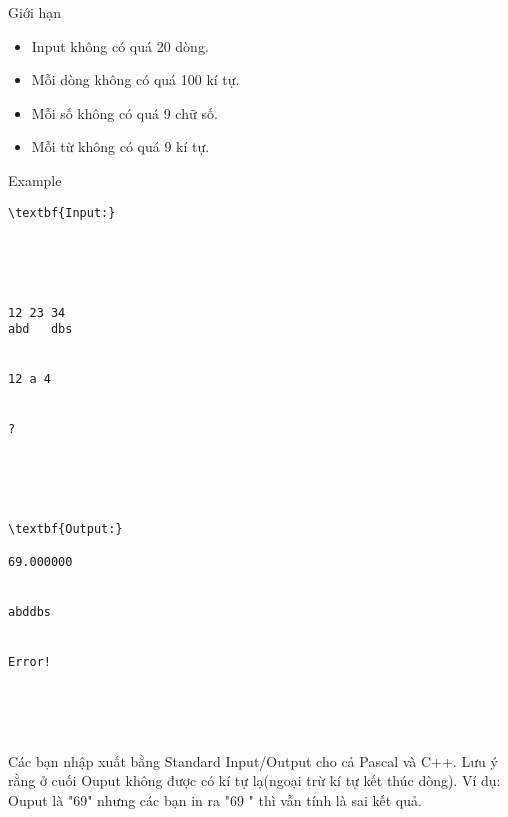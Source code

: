 Giới hạn
\begin{itemize}
	\item     Input không có quá 20 dòng.   
	\item     Mỗi dòng không có quá 100 kí tự.   
	\item     Mỗi số không có quá 9 chữ số.   
	\item     Mỗi từ không có quá 9 kí tự.   
\end{itemize}
Example
\begin{verbatim}
\textbf{Input:}





12 23 34
abd   dbs


12 a 4 


?





\textbf{Output:}

69.000000


abddbs


Error! 





\end{verbatim}

Các bạn nhập xuất bằng Standard Input/Output cho cả Pascal và C++. Lưu ý rằng ở cuối Ouput không được có kí tự lạ(ngoại trừ kí tự kết thúc dòng). Ví dụ: Ouput là "69" nhưng các bạn in ra "69 " thì vẫn tính là sai kết quả.